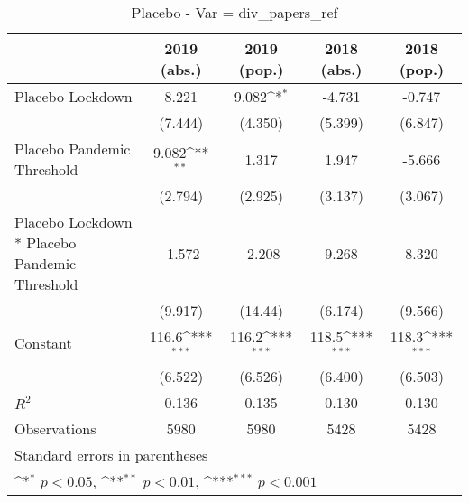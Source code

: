 \documentclass{article}
\begin{document}
{
\def\sym#1{\ifmmode^{#1}\else\(^{#1}\)\fi}
\begin{longtable}{l*{4}{c}}
\caption{Placebo - Var = div\_papers\_ref}\\
\hline\hline\endfirsthead\hline\endhead\hline\endfoot\endlastfoot
                &\multicolumn{1}{c}{2019 (abs.)}&\multicolumn{1}{c}{2019 (pop.)}&\multicolumn{1}{c}{2018 (abs.)}&\multicolumn{1}{c}{2018 (pop.)}\\
\hline
Placebo Lockdown&    8.221         &    9.082\sym{*}  &   -4.731         &   -0.747         \\
                &  (7.444)         &  (4.350)         &  (5.399)         &  (6.847)         \\
Placebo Pandemic Threshold&    9.082\sym{**} &    1.317         &    1.947         &   -5.666         \\
                &  (2.794)         &  (2.925)         &  (3.137)         &  (3.067)         \\
Placebo Lockdown * Placebo Pandemic Threshold&   -1.572         &   -2.208         &    9.268         &    8.320         \\
                &  (9.917)         &  (14.44)         &  (6.174)         &  (9.566)         \\
Constant        &    116.6\sym{***}&    116.2\sym{***}&    118.5\sym{***}&    118.3\sym{***}\\
                &  (6.522)         &  (6.526)         &  (6.400)         &  (6.503)         \\
\hline
\(R^{2}\)       &    0.136         &    0.135         &    0.130         &    0.130         \\
Observations    &     5980         &     5980         &     5428         &     5428         \\
\hline\hline
\multicolumn{5}{l}{\footnotesize Standard errors in parentheses}\\
\multicolumn{5}{l}{\footnotesize \sym{*} \(p<0.05\), \sym{**} \(p<0.01\), \sym{***} \(p<0.001\)}\\
\end{longtable}
}
\end{document}
